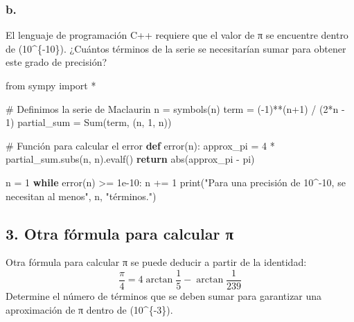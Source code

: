 \documentclass[
  letterpaper,
  DIV=11,
  numbers=noendperiod]{scrartcl}
\newenvironment{Shaded}{\begin{snugshade}}{\end{snugshade}}
\newcommand{\BuiltInTok}[1]{\textcolor[rgb]{0.00,0.23,0.31}{#1}}
\newcommand{\CommentTok}[1]{\textcolor[rgb]{0.37,0.37,0.37}{#1}}
\newcommand{\ControlFlowTok}[1]{\textcolor[rgb]{0.00,0.23,0.31}{\textbf{#1}}}
\newcommand{\DecValTok}[1]{\textcolor[rgb]{0.68,0.00,0.00}{#1}}
\newcommand{\FloatTok}[1]{\textcolor[rgb]{0.68,0.00,0.00}{#1}}
\newcommand{\ImportTok}[1]{\textcolor[rgb]{0.00,0.46,0.62}{#1}}
\newcommand{\KeywordTok}[1]{\textcolor[rgb]{0.00,0.23,0.31}{\textbf{#1}}}
\newcommand{\NormalTok}[1]{\textcolor[rgb]{0.00,0.23,0.31}{#1}}
\newcommand{\OperatorTok}[1]{\textcolor[rgb]{0.37,0.37,0.37}{#1}}
\newcommand{\StringTok}[1]{\textcolor[rgb]{0.13,0.47,0.30}{#1}}
\begin{document}
\subsubsection{b.}\label{b.-1}

El lenguaje de programación C++ requiere que el valor de π se encuentre
dentro de (10\^{}\{-10\}). ¿Cuántos términos de la serie se necesitarían
sumar para obtener este grado de precisión?

\begin{Shaded}
\begin{Highlighting}[]
\ImportTok{from}\NormalTok{ sympy }\ImportTok{import} \OperatorTok{*}

\CommentTok{\# Definimos la serie de Maclaurin}
\NormalTok{n }\OperatorTok{=}\NormalTok{ symbols(}\StringTok{\textquotesingle{}n\textquotesingle{}}\NormalTok{)}
\NormalTok{term }\OperatorTok{=}\NormalTok{ (}\OperatorTok{{-}}\DecValTok{1}\NormalTok{)}\OperatorTok{**}\NormalTok{(n}\OperatorTok{+}\DecValTok{1}\NormalTok{) }\OperatorTok{/}\NormalTok{ (}\DecValTok{2}\OperatorTok{*}\NormalTok{n }\OperatorTok{{-}} \DecValTok{1}\NormalTok{)}
\NormalTok{partial\_sum }\OperatorTok{=}\NormalTok{ Sum(term, (n, }\DecValTok{1}\NormalTok{, n))}

\CommentTok{\# Función para calcular el error}
\KeywordTok{def}\NormalTok{ error(n):}
\NormalTok{    approx\_pi }\OperatorTok{=} \DecValTok{4} \OperatorTok{*}\NormalTok{ partial\_sum.subs(n, n).evalf()}
    \ControlFlowTok{return} \BuiltInTok{abs}\NormalTok{(approx\_pi }\OperatorTok{{-}}\NormalTok{ pi)}


\NormalTok{n }\OperatorTok{=} \DecValTok{1}
\ControlFlowTok{while}\NormalTok{ error(n) }\OperatorTok{\textgreater{}=} \FloatTok{1e{-}10}\NormalTok{:}
\NormalTok{    n }\OperatorTok{+=} \DecValTok{1}
\BuiltInTok{print}\NormalTok{(}\StringTok{"Para una precisión de 10\^{}{-}10, se necesitan al menos"}\NormalTok{, n, }\StringTok{"términos."}\NormalTok{)}
\end{Highlighting}
\end{Shaded}

\subsection{3. Otra fórmula para calcular
π}\label{otra-fuxf3rmula-para-calcular-ux3c0}

Otra fórmula para calcular π se puede deducir a partir de la identidad:
\[
\frac{\pi}{4} = 4 \arctan \frac{1}{5} - \arctan \frac{1}{239}
\] Determine el número de términos que se deben sumar para garantizar
una aproximación de π dentro de (10\^{}\{-3\}).
\end{document}
